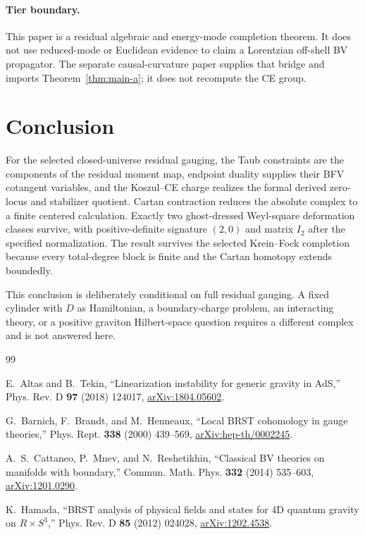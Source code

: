 \documentclass[11pt]{article}
\theoremstyle{remark}
\begin{document}
\paragraph{Tier boundary.}
This paper is a residual algebraic and energy-mode completion theorem.  It
does not use reduced-mode or Euclidean evidence to claim a Lorentzian
off-shell BV propagator.  The separate causal-curvature paper supplies that
bridge and imports Theorem~\ref{thm:main-a}; it does not recompute the CE
group.

\section{Conclusion}

For the selected closed-universe residual gauging, the Taub constraints are
the components of the residual moment map, endpoint duality supplies their
BFV cotangent variables, and the Koszul--CE charge realizes the formal
derived zero-locus and stabilizer quotient.  Cartan contraction reduces the
absolute complex to a finite centered calculation.  Exactly two
ghost-dressed Weyl-square deformation classes survive, with positive-definite
signature $(2,0)$ and matrix $I_2$ after the specified normalization.  The
result survives the selected Krein--Fock completion because every
total-degree block is finite and the Cartan homotopy extends boundedly.

This conclusion is deliberately conditional on full residual gauging.  A
fixed cylinder with $D$ as Hamiltonian, a boundary-charge problem, an
interacting theory, or a positive graviton Hilbert-space question requires a
different complex and is not answered here.

\begin{thebibliography}{99}

E.~Altas and B.~Tekin,
``Linearization instability for generic gravity in AdS,''
Phys. Rev. D \textbf{97} (2018) 124017,
\href{https://arxiv.org/abs/1804.05602}{arXiv:1804.05602}.

G.~Barnich, F.~Brandt, and M.~Henneaux,
``Local BRST cohomology in gauge theories,''
Phys. Rept. \textbf{338} (2000) 439--569,
\href{https://arxiv.org/abs/hep-th/0002245}{arXiv:hep-th/0002245}.

A.~S.~Cattaneo, P.~Mnev, and N.~Reshetikhin,
``Classical BV theories on manifolds with boundary,''
Commun. Math. Phys. \textbf{332} (2014) 535--603,
\href{https://arxiv.org/abs/1201.0290}{arXiv:1201.0290}.

K.~Hamada,
``BRST analysis of physical fields and states for 4D quantum gravity on
$R\times S^3$,''
Phys. Rev. D \textbf{85} (2012) 024028,
\href{https://arxiv.org/abs/1202.4538}{arXiv:1202.4538}.

\end{thebibliography}
\end{document}
